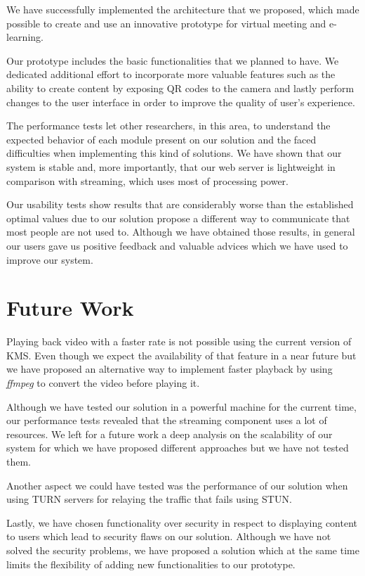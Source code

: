 	We have successfully implemented the architecture that we proposed, which made possible to create and use an innovative prototype for virtual meeting and e-learning.

	Our prototype includes the basic functionalities that we planned to have. We dedicated additional effort to incorporate more valuable features such as the ability to create content by exposing \ac{QR} codes to the camera and lastly perform changes to the user interface in order to improve the quality of user's experience.

	The performance tests let other researchers, in this area, to understand the expected behavior of each module present on our solution and the faced difficulties when implementing this kind of solutions. We have shown that our system is stable and, more importantly, that our web server is lightweight in comparison with streaming, which uses most of processing power.

	Our usability tests show results that are considerably worse than the established optimal values due to our solution propose a different way to communicate that most people are not used to. Although we have obtained those results, in general our users gave us positive feedback and valuable advices which we have used to improve our system. 

\section{Future Work}
\label{section:future}
	Playing back video with a faster rate is not possible using the current version of \ac{KMS}. Even though we expect the availability of that feature in a near future but we have proposed an alternative way to implement faster playback by using \emph{ffmpeg} to convert the video before playing it.

	Although we have tested our solution in a powerful machine for the current time, our performance tests revealed that the streaming component uses a lot of resources. We left for a future work a deep analysis on the scalability of our system for which we have proposed different approaches but we have not tested them.

	Another aspect we could have tested was the performance of our solution when using \ac{TURN} servers for relaying the traffic that fails using \ac{STUN}.

	Lastly, we have chosen functionality over security in respect to displaying content to users which lead to security flaws on our solution. Although we have not solved the security problems, we have proposed a solution which at the same time limits the flexibility of adding new functionalities to our prototype.
\cleardoublepage
